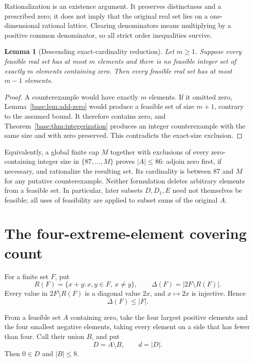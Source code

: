 \documentclass[11pt,a4paper]{article}
\newtheorem{lemma}[theorem]{Lemma}
\theoremstyle{remark}
\newcommand{\card}[1]{\lvert #1\rvert}
\begin{document}
Rationalization is an existence argument. It preserves distinctness and a
prescribed zero; it does not imply that the original real set lies on a
one-dimensional rational lattice. Clearing denominators means multiplying
by a positive common denominator, so all strict order inequalities survive.

\begin{lemma}[Descending exact-cardinality reduction]\label{base:lem:descending-cardinality}
Let $m\ge1$. Suppose every feasible real set has at most $m$ elements and
there is no feasible integer set of exactly $m$ elements containing zero.
Then every feasible real set has at most $m-1$ elements.
\end{lemma}
\begin{proof}
A counterexample would have exactly $m$ elements. If it omitted zero,
Lemma~\ref{base:lem:add-zero} would produce a feasible set of size $m+1$,
contrary to the assumed bound. It therefore contains zero, and
Theorem~\ref{base:thm:integerization} produces an integer counterexample with
the same size and with zero preserved. This contradicts the exact-size
exclusion.
\end{proof}

Equivalently, a global finite cap $M$ together with exclusions of every
zero-containing integer size in $\{87,\ldots,M\}$ proves $|A|\le86$:
adjoin zero first, if necessary, and rationalize the resulting set.
Its cardinality is between $87$ and $M$ for any putative counterexample.
Neither formulation deletes arbitrary elements from a feasible set.
In particular, later subsets $D,D_1,E$ need not themselves be feasible;
all uses of feasibility are applied to subset sums of the original $A$.

\section{The four-extreme-element covering count}\label{base:sec:cover}

For a finite set $F$, put
\[
 R(F)=\{x+y:x,y\in F,\ x\ne y\},
 \qquad \Delta(F)=\card{2F\setminus R(F)}.
\]
Every value in $2F\setminus R(F)$ is a diagonal value $2x$, and
$x\mapsto2x$ is injective.  Hence
\begin{equation}
 \Delta(F)\leq\card F.
 \label{base:eq:delta-trivial}
\end{equation}

From a feasible set $A$ containing zero, take the four largest positive
elements and the four smallest negative elements, taking every element on a
side that has fewer than four.  Call their union $B$, and put
\[
 D=A\setminus B,\qquad d=\card D.
\]
Then $0\in D$ and $\card B\leq8$.
\end{document}
